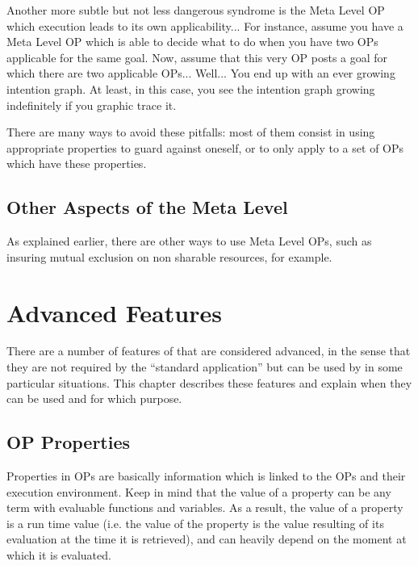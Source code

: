 Another more subtle but not less dangerous syndrome is the Meta Level OP which
execution leads to its own applicability... For instance, assume you have a
Meta Level OP which is able to decide what to do when you have two OPs
applicable for the same goal. Now, assume that this very OP posts a goal for
which there are two applicable OPs... Well... You end up with an ever growing
intention graph. At least, in this case, you see the intention graph growing
indefinitely if you graphic trace it.

There are many ways to avoid these pitfalls: most of them consist in
using appropriate properties to guard against oneself, or to only apply to
a set of OPs which have these properties.

\section{Other Aspects of the Meta Level}

As explained earlier, there are other ways to use Meta Level OPs, such as
insuring mutual exclusion on non sharable resources, for example.

\chapter{Advanced Features}

There are a number of features of \COPRS{} that are considered advanced, in the
sense that they are not required by the ``standard application'' but can be
used by in some particular situations. This chapter describes these features and
explain when they can be used and for which purpose.



\section{OP Properties}

Properties in OPs are basically information which is linked to the OPs and
their execution environment. Keep in mind that the value of a property can be
any term with evaluable functions and variables. As a result, the value of a
property is a run time value (i.e. the value of the property is the value
resulting of its evaluation at the time it is retrieved), and can heavily depend
on the moment at which it is evaluated.

